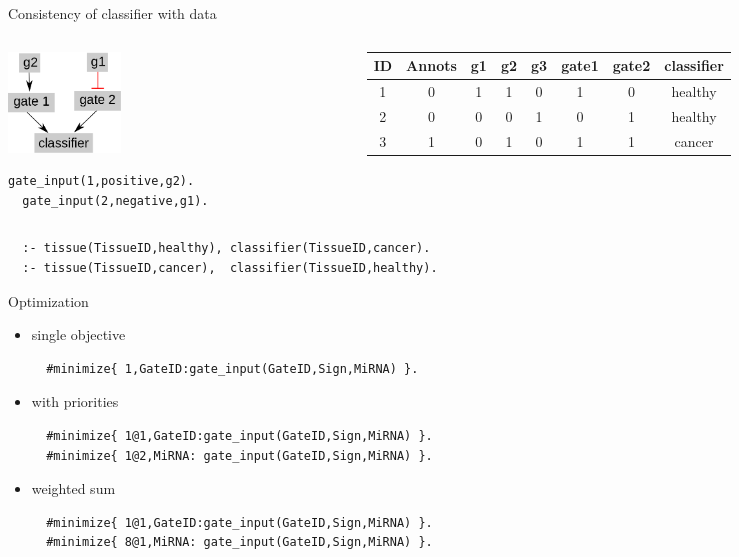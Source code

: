 \documentclass[10pt,dvipsnames]{beamer}
\begin{document}
\begin{frame}[fragile]{Consistency of classifier with data}
 \begin{columns}  
 \begin{column}{0.25\textwidth}
 \includegraphics[width=3cm]{constraints_07.png}
 \color{my_example_color}
  \begin{Verbatim}[fontsize=\small]
  gate_input(1,positive,g2).
  gate_input(2,negative,g1).
  \end{Verbatim}
 \end{column}
 \begin{column}{0.8\textwidth}
 \begin{tabular}{|c|c|c|c|c|c|c|c|}
  \hline
  ID&	Annots&	g1&	g2&	g3& gate1& gate2& classifier\\
  \hline
  1&	0&	1&	1&	0& 1& 0& healthy\\
  2&	0&	0&	0&	1& 0& 1& healthy\\
  3&	1&	0&	1&	0& 1& 1& cancer\\
  \hline
 \end{tabular}
 \end{column}
 \end{columns}
 \vspace{1.5cm}
  \begin{verbatim}
  :- tissue(TissueID,healthy), classifier(TissueID,cancer).
  :- tissue(TissueID,cancer),  classifier(TissueID,healthy).
 \end{verbatim}
\end{frame}


\begin{frame}[fragile]{Optimization}
 \begin{itemize}
  \item single objective
  \begin{verbatim}
  #minimize{ 1,GateID:gate_input(GateID,Sign,MiRNA) }.
 \end{verbatim}
  \item with priorities
  \begin{verbatim}
  #minimize{ 1@1,GateID:gate_input(GateID,Sign,MiRNA) }.
  #minimize{ 1@2,MiRNA: gate_input(GateID,Sign,MiRNA) }.
 \end{verbatim}
  \item weighted sum
  \begin{verbatim}
  #minimize{ 1@1,GateID:gate_input(GateID,Sign,MiRNA) }.
  #minimize{ 8@1,MiRNA: gate_input(GateID,Sign,MiRNA) }.
 \end{verbatim}
 \end{itemize}
\end{frame}
\end{document}
